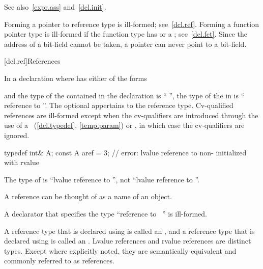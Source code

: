 \pnum
See also~\ref{expr.ass} and~\ref{dcl.init}.

\pnum
\begin{note}
Forming a pointer to reference type is ill-formed; see~\ref{dcl.ref}.
Forming a function pointer type is ill-formed if the function type has
 or a ;
see~\ref{dcl.fct}.
Since the address of a bit-field cannot be taken,
a pointer can never point to a bit-field.
\end{note}

[dcl.ref]{References}%

\pnum
In a declaration
where
has either of the forms
\begin{ncsimplebnf}
\terminal{\&}  \br
\terminal{\&\&}  
\end{ncsimplebnf}
and the type of the contained  in the declaration
is ``
'',
the type of the  in
is `` reference to
''.
The optional  appertains to the reference type.
Cv-qualified references are ill-formed except when the cv-qualifiers
are introduced through the use of a
~(\ref{dcl.typedef}, \ref{temp.param}) or
,
in which case the cv-qualifiers are ignored.
\begin{example}
\begin{codeblock}
typedef int& A;
const A aref = 3;   // error: lvalue reference to non- initialized with rvalue
\end{codeblock}

The type of
is ``lvalue reference to '',
not ``lvalue reference to ''.
\end{example}
\begin{note}
A reference can be thought of as a name of an object.
\end{note}
%
A declarator that specifies the type
``reference to \cv{}~''
is ill-formed.


\pnum
A reference type that is declared using \tcode{\&} is called an
, and a reference type that
is declared using \tcode{\&\&} is called an
. Lvalue references and
rvalue references are distinct types. Except where explicitly noted, they are
semantically equivalent and commonly referred to as references.

